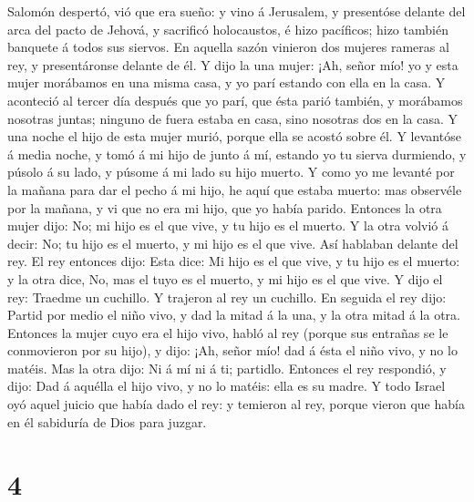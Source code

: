 Salomón despertó, vió que era sueño: y vino á Jerusalem, y presentóse
delante del arca del pacto de Jehová, y sacrificó holocaustos, é hizo
pacíficos; hizo también banquete á todos sus siervos.  En
aquella sazón vinieron dos mujeres rameras al rey, y presentáronse
delante de él.  Y dijo la una mujer: ¡Ah, señor mío! yo y
esta mujer morábamos en una misma casa, y yo parí estando con ella en la
casa.  Y aconteció al tercer día después que yo parí, que
ésta parió también, y morábamos nosotras juntas; ninguno de fuera estaba
en casa, sino nosotras dos en la casa.  Y una noche el
hijo de esta mujer murió, porque ella se acostó sobre él.
 Y levantóse á media noche, y tomó á mi hijo de junto á
mí, estando yo tu sierva durmiendo, y púsolo á su lado, y púsome á mi
lado su hijo muerto.  Y como yo me levanté por la mañana
para dar el pecho á mi hijo, he aquí que estaba muerto: mas observéle
por la mañana, y vi que no era mi hijo, que yo había parido.
 Entonces la otra mujer dijo: No; mi hijo es el que vive,
y tu hijo es el muerto. Y la otra volvió á decir: No; tu hijo es el
muerto, y mi hijo es el que vive. Así hablaban delante del rey.
 El rey entonces dijo: Esta dice: Mi hijo es el que vive,
y tu hijo es el muerto: y la otra dice, No, mas el tuyo es el muerto, y
mi hijo es el que vive.  Y dijo el rey: Traedme un
cuchillo. Y trajeron al rey un cuchillo.  En seguida el
rey dijo: Partid por medio el niño vivo, y dad la mitad á la una, y la
otra mitad á la otra.  Entonces la mujer cuyo era el hijo
vivo, habló al rey (porque sus entrañas se le conmovieron por su hijo),
y dijo: ¡Ah, señor mío! dad á ésta el niño vivo, y no lo matéis. Mas la
otra dijo: Ni á mí ni á ti; partidlo.  Entonces el rey
respondió, y dijo: Dad á aquélla el hijo vivo, y no lo matéis: ella es
su madre.  Y todo Israel oyó aquel juicio que había dado
el rey: y temieron al rey, porque vieron que había en él sabiduría de
Dios para juzgar.

\hypertarget{section-3}{%
\section{4}\label{section-3}}

